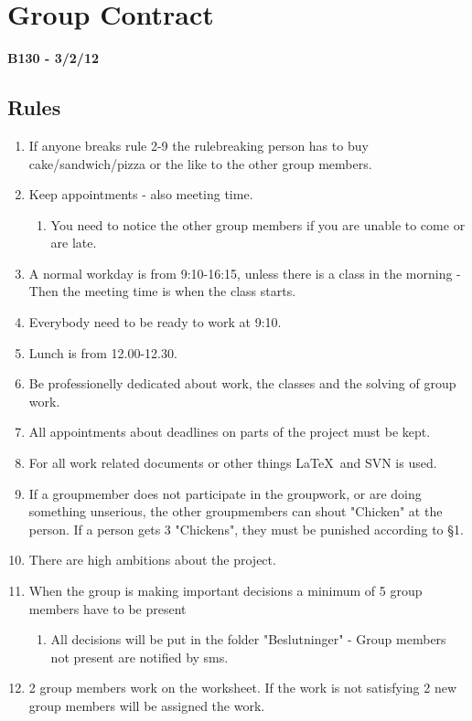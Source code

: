 

\chapter{Group Contract}
\label{chap:groupcontract}
\textbf{B130 - 3/2/12}
\section*{Rules}
\renewcommand{\labelenumi}{§ \arabic{enumi}}
\renewcommand{\labelenumii}{\alph{enumii}}
\begin{enumerate}
\item If anyone breaks rule 2-9 the rulebreaking person has to buy cake/sandwich/pizza or the like to the other group members.
\item Keep appointments - also meeting time. 
	\begin{enumerate}
	\item You need to notice the other group members if you are unable to come or are late.
	\end{enumerate}
\item A normal workday is from 9:10-16:15, unless there is a class in the morning - Then the meeting time is when the class starts.
\item Everybody need to be ready to work at 9:10.
\item Lunch is from 12.00-12.30.
\item Be professionelly dedicated about work, the classes and the solving of group work.
\item All appointments about deadlines on parts of the project must be kept.
\item For all work related documents or other things \LaTeX~and SVN is used.
\item If a groupmember does not participate in the groupwork, or are doing something unserious, the other groupmembers can shout "Chicken" at the person. If a person gets 3 "Chickens", they must be punished according to §1.
\item There are high ambitions about the project.
\item When the group is making important decisions a minimum of 5 group members have to be present 
	\begin{enumerate}
	\item All decisions will be put in the folder "Beslutninger" - Group members not present are notified by sms.
	\end{enumerate}
\item 2 group members work on the worksheet.  If the work is not satisfying 2 new group members will be assigned the work.

\end{enumerate}
